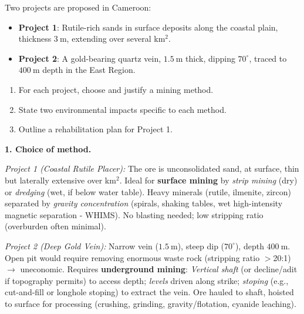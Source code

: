 \documentclass[11pt]{article}
\begin{document}
\begin{exoresolu}
Two projects are proposed in Cameroon:
\begin{itemize}
\item \textbf{Project 1}: Rutile-rich sands in surface deposits along the coastal plain, thickness $3\ \mathrm{m}$, extending over several km$^2$.
\item \textbf{Project 2}: A gold-bearing quartz vein, $1.5\ \mathrm{m}$ thick, dipping $70^\circ$, traced to $400\ \mathrm{m}$ depth in the East Region.
\end{itemize}
\begin{enumerate}
\item For each project, choose and justify a mining method.
\item State two environmental impacts specific to each method.
\item Outline a rehabilitation plan for Project 1.
\end{enumerate}
\tcblower
\textbf{1. Choice of method.}

\emph{Project 1 (Coastal Rutile Placer):} The ore is unconsolidated sand, at surface, thin but laterally extensive over km$^2$. Ideal for \textbf{surface mining} by \emph{strip mining} (dry) or \emph{dredging} (wet, if below water table). Heavy minerals (rutile, ilmenite, zircon) separated by \emph{gravity concentration} (spirals, shaking tables, wet high-intensity magnetic separation - WHIMS). No blasting needed; low stripping ratio (overburden often minimal).

\emph{Project 2 (Deep Gold Vein):} Narrow vein ($1.5\ \mathrm{m}$), steep dip ($70^\circ$), depth $400\ \mathrm{m}$. Open pit would require removing enormous waste rock (stripping ratio $>$20:1) $\rightarrow$ uneconomic. Requires \textbf{underground mining}: \emph{Vertical shaft} (or decline/adit if topography permits) to access depth; \emph{levels} driven along strike; \emph{stoping} (e.g., cut-and-fill or longhole stoping) to extract the vein. Ore hauled to shaft, hoisted to surface for processing (crushing, grinding, gravity/flotation, cyanide leaching).


\end{exoresolu}
\end{document}
